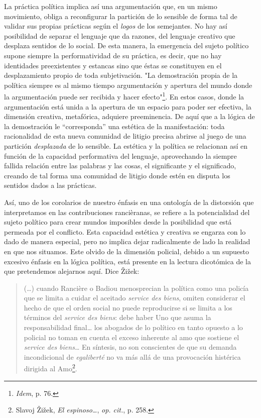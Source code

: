 \documentclass{book}
\begin{document}
La práctica política implica así una argumentación que, en un mismo
movimiento, obliga a reconfigurar la partición de lo sensible de forma
tal de validar sus propias prácticas según el \emph{logos} de los
semejantes. No hay así posibilidad de separar el lenguaje que da
razones, del lenguaje creativo que desplaza sentidos de lo social. De
esta manera, la emergencia del sujeto político supone siempre la
performatividad de su práctica, es decir, que no hay identidades
preexistentes y estancas sino que éstas se constituyen en el
desplazamiento propio de toda subjetivación. "La demostración propia de
la política siempre es al mismo tiempo argumentación y apertura del
mundo donde la argumentación puede ser recibida y hacer
efecto"\footnote{\emph{Idem}, p. 76.}. En estos casos, donde la
argumentación está unida a la apertura de un espacio para poder ser
efectiva, la dimensión creativa, metafórica, adquiere preeminencia. De
aquí que a la lógica de la demostración le ``corresponda'' una estética
de la manifestación: toda racionalidad de esta nueva comunidad de
litigio precisa abrirse al juego de una partición \emph{desplazada} de
lo sensible. La estética y la política se relacionan así en función de
la capacidad performativa del lenguaje, aprovechando la siempre fallida
relación entre las palabras y las cosas, el significante y el
significado, creando de tal forma una comunidad de litigio donde estén
en disputa los sentidos dados a las prácticas.

Así, uno de los corolarios de nuestro énfasis en una ontología de la
distorsión que interpretamos en las contribuciones rancièranas, se
refiere a la potencialidad del sujeto político para crear mundos
imposibles desde la posibilidad que está permeada por el conflicto. Esta
capacidad estética y creativa se engarza con lo dado de manera especial,
pero no implica dejar radicalmente de lado la realidad en que nos
situamos. Este olvido de la dimensión policial, debido a un supuesto
excesivo énfasis en la lógica política, está presente en la lectura
dicotómica de la que pretendemos alejarnos aquí. Dice Žižek:

\begin{quote}
(\dots) cuando Rancière o Badiou menosprecian la política como una
policía que se limita a cuidar el aceitado \emph{service des biens},
omiten considerar el hecho de que el orden social no puede reproducirse
si se limita a los términos del \emph{service des biens}: debe haber Uno
que asuma la responsabilidad final\ldots{} los abogados de lo político
en tanto opuesto a lo policial no toman en cuenta el exceso inherente al
amo que sostiene el \emph{service des biens}\ldots{} En síntesis, no son
conscientes de que su demanda incondicional de \emph{egaliberté} no va
más allá de una provocación histérica dirigida al Amo\footnote{Slavoj
  Žižek, \emph{El espinoso\ldots{}}, \emph{op. cit.}, p. 258.}.
\end{quote}
\end{document}
